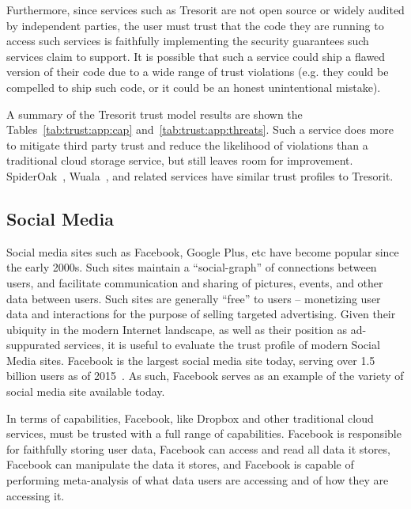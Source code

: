 Furthermore, since services such as Tresorit are not open source or
widely audited by independent parties, the user must trust that the
code they are running to access such services is faithfully
implementing the security guarantees such services claim to
support. It is possible that such a service could ship a flawed
version of their code due to a wide range of trust violations
(e.g. they could be compelled to ship such code, or it could be an
honest unintentional mistake).

A summary of the Tresorit trust model results are shown the
Tables~\ref{tab:trust:app:cap} and~\ref{tab:trust:app:threats}. Such a
service does more to mitigate third party trust and reduce the
likelihood of violations than a traditional cloud storage service, but
still leaves room for improvement. SpiderOak~\cite{spideroak},
Wuala~\cite{wuala}, and related services have similar trust profiles
to Tresorit.

\subsection{Social Media}

Social media sites such as Facebook, Google Plus, etc have become
popular since the early 2000s. Such sites maintain a ``social-graph''
of connections between users, and facilitate communication and sharing
of pictures, events, and other data between users. Such sites are
generally ``free'' to users -- monetizing user data and interactions
for the purpose of selling targeted advertising. Given their ubiquity
in the modern Internet landscape, as well as their position as
ad-suppurated services, it is useful to evaluate the trust profile of
modern Social Media sites. Facebook is the largest social media site
today, serving over 1.5 billion users as of 2015~\cite{foster2014}. As
such, Facebook serves as an example of the variety of social media
site available today.

In terms of capabilities, Facebook, like Dropbox and other traditional
cloud services, must be trusted with a full range of
capabilities. Facebook is responsible for faithfully storing user
data, Facebook can access and read all data it stores, Facebook can
manipulate the data it stores, and Facebook is capable of performing
meta-analysis of what data users are accessing and of how they are
accessing it.

